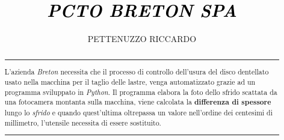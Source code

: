 \documentclass[a4paper, notitlepage, 12pt]{article}
\title{\textcolor{black}{\emph{PCTO BRETON SPA}}}
\author{PETTENUZZO RICCARDO}%
\date{}
\begin{document}
    \normalsize
    \maketitle
    \begin{abstract}
        \noindent \rule{\linewidth}{.6pt}\par
        \noindent L'azienda \emph{Breton} necessita che il processo di controllo dell'usura del disco dentellato usato nella
        macchina per il taglio delle lastre, venga automatizzato grazie ad un programma sviluppato in \emph{Python}.
        Il programma elabora la foto dello sfrido scattata da una fotocamera montanta sulla macchina, viene calcolata
        la \textbf{differenza di spessore} lungo lo \emph{sfrido} e quando quest'ultima oltrepassa un valore nell'ordine dei centesimi 
        di millimetro, l'utensile necessita di essere sostituito.
        \par
        \noindent \rule{\linewidth}{.6pt}  
    \end{abstract}
    \thispagestyle{plain}
\end{document}
